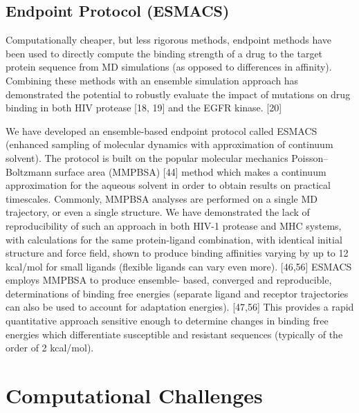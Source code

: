 \documentclass[conference]{IEEEtran}
\begin{document}
\subsection{Endpoint Protocol (ESMACS)}\label{sec:esmacs}

Computationally cheaper, but less rigorous methods, endpoint methods have been used to directly compute the binding strength of a drug to the target protein sequence from MD simulations (as opposed to differences in affinity). Combining these methods with an ensemble simulation approach has demonstrated the potential to robustly evaluate the impact of mutations on drug binding in both HIV protease [18, 19] and the EGFR kinase. [20]     

We have developed an ensemble-based endpoint protocol called ESMACS (enhanced sampling of molecular dynamics with approximation of continuum solvent). The protocol is built on the popular molecular mechanics Poisson–Boltzmann surface area (MMPBSA) [44] method which makes a continuum approximation for the aqueous solvent in order to obtain results on practical timescales. Commonly, MMPBSA analyses are performed on a single MD trajectory, or even a single structure. We have demonstrated the lack of reproducibility of such an approach in both HIV-1 protease and MHC systems, with calculations for the same protein-ligand combination, with identical initial structure and force field, shown to produce binding affinities varying by up to 12 kcal/mol for small ligands (flexible ligands can vary even more). [46,56] ESMACS employs MMPBSA to produce ensemble- based, converged and reproducible, determinations of binding free energies (separate ligand and receptor trajectories can also be used to account for adaptation energies). [47,56] This provides a rapid quantitative approach sensitive enough to determine changes in binding free energies which differentiate susceptible and resistant sequences (typically of the order of 2 kcal/mol).

\section{Computational Challenges}\label{sec:cc}

\end{document}
